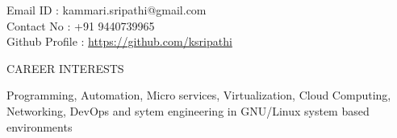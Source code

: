 \documentclass{resume} %
\newcommand{\blank}[1]{\hspace*{#1}}
\begin{document}
\blank{5 cm}
{Email ID} \blank{0.7 cm} :
kammari.sripathi@gmail.com \\
\blank{5 cm} 
{Contact No} \blank{0.3 cm} :
+91 9440739965 \\
\blank{5 cm}
{Github Profile : }
\url{https://github.com/ksripathi}
\sectionlineskip \\


\begin{rSection}{CAREER INTERESTS}
  
  { Programming, Automation, Micro services, Virtualization, Cloud
    Computing, Networking, DevOps and sytem engineering in GNU/Linux
    system based environments }

\end{rSection}

\end{document}
